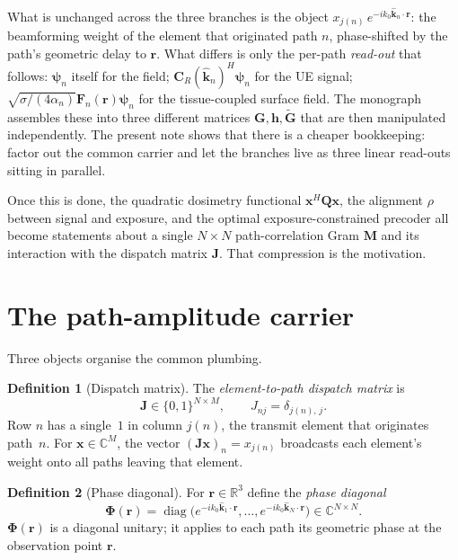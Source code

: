 \documentclass[11pt,a4paper]{article}
\theoremstyle{definition}
\newtheorem{definition}[definition]{Definition}
\newcommand{\khat}{\hat{\bm{k}}}
\newcommand{\rr}{\mathbf{r}}
\newcommand{\Complex}{\mathbb{C}}
\newcommand{\Reals}{\mathbb{R}}
\newcommand{\Jmat}{\mathbf{J}}                 %
\newcommand{\Phimat}{\mathbf{\Phi}}            %
\newcommand{\Mmat}{\mathbf{M}}                 %
\newcommand{\Qmat}{\mathbf{Q}}                 %
\newcommand{\xx}{\mathbf{x}}
\newcommand{\hh}{\mathbf{h}}
\newcommand{\psin}{\bm{\psi}_n}
\newcommand{\FnR}{\mathbf{F}_n(\rr)}
\newcommand{\GG}{\mathbf{G}}
\newcommand{\Gtil}{\tilde{\mathbf{G}}}
\begin{document}
What is unchanged across the three branches is the object
$x_{j(n)}\,e^{-ik_0\khat_n\cdot\rr}$: the beamforming weight of the element
that originated path $n$, phase-shifted by the path's geometric delay to
$\rr$.  What differs is only the per-path \emph{read-out} that follows:
$\psin$ itself for the field; $\mathbf{C}_R(\khat_n)^H\psin$ for the UE
signal; $\sqrt{\sigma/(4\alpha_n)}\FnR\psin$ for the tissue-coupled surface
field.  The monograph assembles these into three different matrices
$\GG,\hh,\Gtil$ that are then manipulated independently.  The present
note shows that there is a cheaper bookkeeping: factor out the common
carrier and let the branches live as three linear read-outs sitting in
parallel.

Once this is done, the quadratic dosimetry functional $\xx^H\Qmat\xx$,
the alignment $\rho$ between signal and exposure, and the optimal
exposure-constrained precoder all become statements about a single
$N\times N$ path-correlation Gram $\Mmat$ and its interaction with the
dispatch matrix $\Jmat$.  That compression is the motivation.

\section{The path-amplitude carrier}\label{sec:carrier}

Three objects organise the common plumbing.

\begin{definition}[Dispatch matrix]\label{def:J}
The \emph{element-to-path dispatch matrix} is
\begin{equation}\label{eq:J-def}
  \Jmat\in\{0,1\}^{N\times M},
  \qquad
  J_{nj}=\delta_{j(n),\,j}.
\end{equation}
Row $n$ has a single~$1$ in column $j(n)$, the transmit element that
originates path~$n$.  For $\xx\in\Complex^M$, the vector
$(\Jmat\xx)_n=x_{j(n)}$ broadcasts each element's weight onto all paths
leaving that element.
\end{definition}

\begin{definition}[Phase diagonal]\label{def:Phi}
For $\rr\in\Reals^3$ define the \emph{phase diagonal}
\begin{equation}\label{eq:Phi-def}
  \Phimat(\rr)=\operatorname{diag}\!\bigl(e^{-ik_0\khat_1\cdot\rr},\dots,
  e^{-ik_0\khat_N\cdot\rr}\bigr)\in\Complex^{N\times N}.
\end{equation}
$\Phimat(\rr)$ is a diagonal unitary; it applies to each path its
geometric phase at the observation point $\rr$.
\end{definition}
\end{document}
